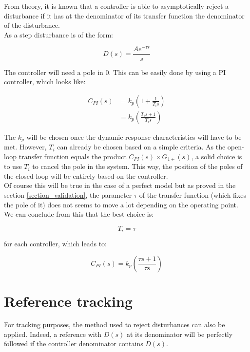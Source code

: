 From theory, it is known that a controller is able to asymptotically reject a disturbance if it has at the denominator
of its transfer function the denominator of the disturbance.\\

As a step disturbance is of the form:

\begin{equation}
    D(s) = \frac{A e^{-\tau s}}{s}
\end{equation}

The controller will need a pole in $0$. This can be easily done by using a PI controller, which looks like:

\begin{align}
    C_{PI}(s) &= k_p \left( 1 + \frac{1}{T_i s} \right)\\
    &= k_p \left(\frac{T_i s + 1}{T_i s} \right)
    \label{eq:general_PI}
\end{align}

The $k_p$ will be chosen once the dynamic response characteristics will have to be met. However, $T_i$ can already be 
chosen based on a simple criteria. As the open-loop transfer function equals the product $C_{PI}(s) \times G_{1+} (s)$, a
solid choice is to use $T_i$ to cancel the pole in the system. This way, the position of the poles of the closed-loop
will be entirely based on the controller.\\
Of course this will be true in the case of a perfect model but as proved in the section \ref{section_validation}, the
parameter $\tau$ of the transfer function (which fixes the pole of it) does not seems to move a lot depending on the 
operating point. We can conclude from this that the best choice is:

\begin{equation}
    T_i = \tau
\end{equation}

for each controller, which leads to:

\begin{equation}
    C_{PI}(s) = k_p \left( \frac{\tau s + 1}{\tau s} \right) 
    \label{eq:controller_PI}
\end{equation}


\iffalse
\section{Reference tracking}

For tracking purposes, the method used to reject disturbances can also be applied. Indeed, a reference with $D(s)$ at
its denominator will be perfectly followed if the controller denominator contains $D(s)$.

